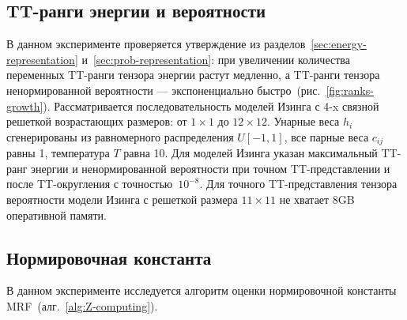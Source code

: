 \subsection{TT\hyp{}ранги энергии и вероятности \label{sec::exp1}}
В данном эксперименте проверяется утверждение из разделов~\ref{sec:energy-representation} и~\ref{sec:prob-representation}: при увеличении количества переменных TT\hyp{}ранги тензора энергии растут медленно, а TT\hyp{}ранги тензора ненормированной вероятности --- экспоненциально быстро~(рис.~\ref{fig:ranks-growth}). Рассматривается последовательность моделей Изинга с 4-x связной решеткой возрастающих размеров: от $1 \times 1$ до $12 \times 12$. Унарные веса $h_i$ сгенерированы из равномерного распределения $U[-1, 1]$, все парные веса $c_{ij}$ равны 1, температура $T$ равна 10. Для моделей Изинга указан максимальный TT\hyp{}ранг энергии и ненормированной вероятности при точном TT\hyp{}представлении и после TT\hyp{}округления с точностью~$10^{-8}$. Для точного TT\hyp{}представления тензора вероятности модели Изинга с решеткой размера $11 \times 11$ не хватает $8$GB оперативной памяти.


\subsection{Нормировочная константа \label{sec::expZ}}
В данном эксперименте исследуется алгоритм оценки нормировочной константы MRF~(алг.~\ref{alg:Z-computing}).

